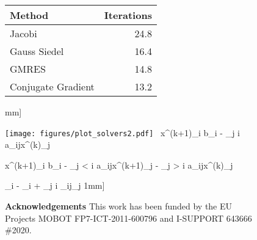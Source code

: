 \documentclass[runningheads]{llncs}
\begin{document}
\begin{figure}[]
\centering

\begin{minipage}{0.4\textwidth} 

\centering
\begin{minipage}{\linewidth} \centering
    \begin{tabular}{l|r }
    \hline
    Method & Iterations \\ \hline Jacobi & 24.8 \\ \hline
    Gauss Siedel & 16.4 \\ \hline
    GMRES & 14.8 \\ \hline
    Conjugate Gradient & 13.2 \\ \hline
    \end{tabular}\2mm]
\end{minipage} \begin{minipage}{0.5\textwidth}
\centering
\texttt{[image: figures/plot\_solvers2.pdf]}
\
x^{(k+1)}_i \gets  {} \left\lbrace b_i - \sum_{j \neq i} a_{ij}x^{(k)}_j \right\rbrace {}
\label{eqn:jacobi}

x^{(k+1)}_i \gets {} \left\lbrace b_i - \sum_{j < i} a_{ij}x^{(k+1)}_j - \sum_{j > i} a_{ij}x^{(k)}_j\right\rbrace {}
\label{eqn:gauss}

\mu_i \gets -  \left\lbrace \theta_i + \sum_{j \neq i} \Theta_{ij}\mu_j \right\rbrace \text{,}
\label{eqn:meanfield}
1mm]


\noindent \textbf{Acknowledgements}
This work has been funded by the EU Projects MOBOT FP7-ICT-2011-600796 and I-SUPPORT 643666 \#2020.


\end{minipage}
\end{minipage}
\end{figure}
\end{document}
